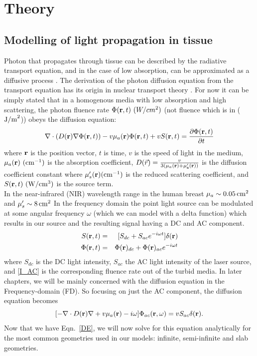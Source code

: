 \chapter{Theory}
\section{Modelling of light propagation in tissue}
Photon that propagates through tissue can be described by the radiative transport equation, and in the case of low absorption, can be approximated as a diffusive process \cite{Ishimaru1978,rossum_99_1}. The derivation of the photon diffusion equation from the transport equation has its origin in nuclear transport theory \cite{Case1967}. For now it can be simply stated that in a homogenous media with low absorption and high scattering, the photon fluence rate $\Phi({\bf r},t) \ (W/cm^{2})$ (not fluence which is in ($\rm{J/m}^{2}$)) obeys the diffusion equation:
\begin{equation}
\label{DEtime}
\nabla\cdot ( D({\bf r}) \nabla \Phi({\bf r},t)) - v\mu_a({\bf r}) \Phi({\bf r},t) + v S({\bf r},t) = \frac{\partial \Phi({\bf r},t)}{\partial t}
\end{equation}
\noindent
where ${\bf r}$ is the position vector, $t$ is time, $v$ is the speed of light in the medium, $\mu_a({\bf r})\ (\rm{cm^{-1}})$ is the absorption coefficient, $D(\vec{r})=\frac{v}{3(\mu_a(\bf{r})+\mu_s^{\prime}({\bf r}))}$ is the diffusion coefficient constant where $\mu_s'({\bf r}) (\rm{cm^{-1}})$ is the reduced scattering coefficient, and $S({\bf r},t)\ (\rm{W/cm^{3}})$ is the source term. \\
In the near-infrared (NIR) wavelength range in the human breast $\mu_a\sim 0.05\,\rm{cm^2}$ and $\mu_s^{\prime}\sim 8\,\rm{cm^2}$ In the frequency domain the point light source can be modulated at some angular frequency $\omega$ (which we can model with a delta function) which results in our source and the resulting  signal having a DC and AC component. 
\begin{eqnarray}
\label{AC}
S({\bf r},t) & = & [S_{dc} + S_{ac}e^{-i\omega
  t}]\delta({\bf r}) \\
\label{I_AC}
\Phi({\bf r},t) & = & \Phi({\bf r})_{dc} + \Phi({\bf r})_{ac}e^{-i\omega t}
\end{eqnarray}
\noindent
where  $S_{dc}$ is the DC light intensity, $S_{ac}$ the AC light intensity of the laser source, and \ref{I_AC} is the corresponding fluence rate out of the turbid media. In later chapters, we will be mainly concerned with the diffusion equation in the Frequency-domain (FD). So focusing on just the AC component, the diffusion equation becomes
\begin{equation}
\label{DE}
[-\nabla \cdot D({\bf r}) \nabla + v \mu_a({\bf r})-i\omega]\Phi_{ac}({\bf
  r},\omega)=vS_{ac}\delta({\bf r}).
\end{equation}
\noindent
Now that we have Eqn.~\ref{DE}, we will now solve for this equation analytically for the most common geometries used in our models: infinite, semi-infinite and slab geometries.

